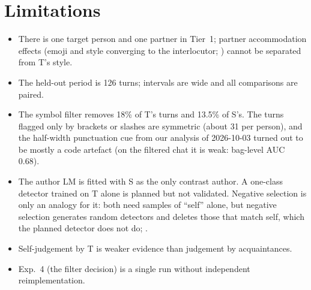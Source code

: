 \section{Limitations}
\label{sec:limitations}

\begin{itemize}
\item There is one target person and one partner in Tier~1; partner accommodation effects (emoji and style converging to the interlocutor; \citealp{marko2022depends}) cannot be separated from T's style.
\item The held-out period is 126 turns; intervals are wide and all comparisons are paired.
\item The symbol filter removes 18\% of T's turns and 13.5\% of S's.
The turns flagged only by brackets or slashes are symmetric (about 31 per person), and the half-width punctuation cue from our analysis of 2026-10-03 turned out to be mostly a code artefact (on the filtered chat it is weak: bag-level AUC 0.68).
\item The author LM is fitted with S as the only contrast author.
A one-class detector trained on T alone is planned but not validated.
Negative selection \citep{forrest1994self} is only an analogy for it: both need samples of ``self'' alone, but negative selection generates random detectors and deletes those that match self, which the planned detector does not do; .
\item Self-judgement by T is weaker evidence than judgement by acquaintances.
\item Exp.~4 (the filter decision) is a single run without independent reimplementation.
\end{itemize}
